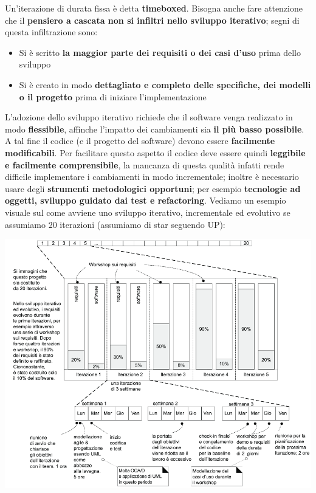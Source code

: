 \documentclass[12pt]{article}
\begin{document}
Un'iterazione di durata fissa è detta \textbf{timeboxed}. \newline
Bisogna anche fare attenzione che il \textbf{pensiero a cascata non si infiltri nello sviluppo iterativo}; segni di questa infiltrazione sono:
\begin{itemize}
    \item Si è scritto \textbf{la maggior parte dei requisiti o dei casi d'uso} prima dello sviluppo
    \item Si è creato in modo \textbf{dettagliato e completo delle specifiche, dei modelli o il progetto} prima di iniziare l'implementazione 
\end{itemize}
L'adozione dello sviluppo iterativo richiede che il software venga realizzato in modo \textbf{flessibile}, affinche l'impatto dei cambiamenti sia \textbf{il più basso possibile}. A tal fine il codice (e il progetto del software) devono essere \textbf{facilmente modificabili}.
Per facilitare questo aspetto il codice deve essere quindi \textbf{leggibile e facilmente comprensibile}, la mancanza di questa qualità infatti rende difficile implementare i cambiamenti in modo incrementale; inoltre è necessario usare degli \textbf{strumenti metodologici opportuni}; per esempio \textbf{tecnologie ad oggetti, sviluppo guidato dai test e refactoring}.
Vediamo un esempio visuale sul come avviene uno sviluppo iterativo, incrementale ed evolutivo se assumiamo 20 iterazioni (assumiamo di star seguendo UP):
\begin{center}
    \includegraphics[width = 1\textwidth]{Images/17.png}
\end{center}
\end{document}
